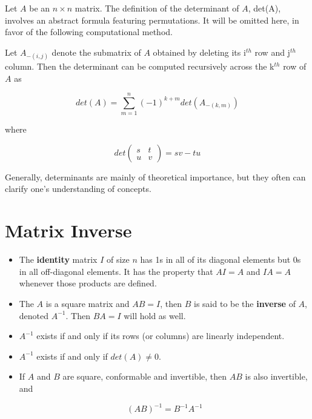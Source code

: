 Let $A$ be an $n \times n$ matrix.  The definition of the determinant of
$A$, det(A), involves an abstract formula featuring permutations.  It will be
omitted here, in favor of the following computational method.

Let $A_{-(i,j)}$ denote the submatrix of $A$ obtained by deleting its
i$^{th}$ row and j$^{th}$ column.  Then the determinant can be computed
recursively across the k$^{th}$ row of $A$ as

\begin{equation}
det(A) =
\sum_{m=1}^n (-1)^{k+m} det(A_{-(k,m)})
\end{equation}

where

\begin{equation}
det
\left (
\begin{array}{cc}
s & t   \\
u & v 
\end{array}
\right ) = sv -tu
\end{equation}

Generally, determinants are mainly of theoretical importance, but they
often can clarify one's understanding of concepts.

\section{Matrix Inverse}
\label{matrixinverse}

\begin{itemize}

\item The {\bf identity} matrix $I$ of size $n$ has 1s in all of its
diagonal elements but 0s in all off-diagonal elements.  It has the
property that $AI = A$ and $IA = A$ whenever those products are defined.

\item The $A$ is a square matrix and $AB = I$, then $B$ is said to be the
{\bf inverse} of $A$, denoted $A^{-1}$.  Then $BA = I$ will hold as well.

\item $A^{-1}$ exists if and only if its rows (or columns) are
linearly independent.

\item $A^{-1}$ exists if and only if $det(A) \neq 0$.

\item If $A$ and $B$ are square, conformable and invertible, then $AB$ is also
invertible, and

\begin{equation}
(AB)^{-1} = B^{-1} A^{-1}
\end{equation}

\end{itemize}


